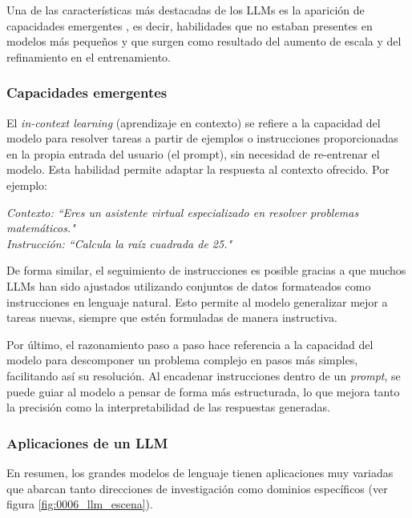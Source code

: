             \noindent Una de las características más destacadas de los LLMs es la aparición de capacidades emergentes \cite{0005_journeyLLM}, es decir, habilidades que no estaban presentes en modelos más pequeños y que surgen como resultado del aumento de escala y del refinamiento en el entrenamiento.
            
            \subsubsection{Capacidades emergentes}
            
                El \textit{in-context learning} (aprendizaje en contexto) se refiere a la capacidad del modelo para resolver tareas a partir de ejemplos o instrucciones proporcionadas en la propia entrada del usuario (el prompt), sin necesidad de re-entrenar el modelo. Esta habilidad permite adaptar la respuesta al contexto ofrecido. Por ejemplo:
                
                \noindent \textit{Contexto: ``Eres un asistente virtual especializado en resolver problemas matemáticos."} \\
                \textit{Instrucción: ``Calcula la raíz cuadrada de 25."}
                
                \noindent De forma similar, el seguimiento de instrucciones es posible gracias a que muchos LLMs han sido ajustados utilizando conjuntos de datos formateados como instrucciones en lenguaje natural. Esto permite al modelo generalizar mejor a tareas nuevas, siempre que estén formuladas de manera instructiva.
                
                \noindent Por último, el razonamiento paso a paso hace referencia a la capacidad del modelo para descomponer un problema complejo en pasos más simples, facilitando así su resolución. Al encadenar instrucciones dentro de un \textit{prompt}, se puede guiar al modelo a pensar de forma más estructurada, lo que mejora tanto la precisión como la interpretabilidad de las respuestas generadas.

            \subsubsection{Aplicaciones de un LLM}

                En resumen, los grandes modelos de lenguaje tienen aplicaciones muy variadas que abarcan tanto direcciones de investigación como dominios específicos (ver figura \ref{fig:0006_llm_escena}). 
            
